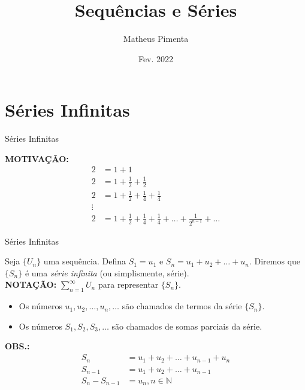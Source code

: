 \documentclass[hyperref={pdfpagelabels=false}]{beamer}
\title{Sequências e Séries}
\author[Matheus Pimenta]{Matheus Pimenta}
\institute[UEL]{\normalsize Universidade Estadual de Londrina \\
	Londrina
}
\date{Fev. 2022}
\begin{document}
	
\begin{frame}
\titlepage
\end{frame} 



\section{Séries Infinitas}

\begin{frame}{Séries Infinitas}

{\bf MOTIVAÇÃO:} \pause
\begin{align*}
 2 &= 1 + 1 \\
 2 &= 1 + \frac{1}{2} + \frac{1}{2} \\
 2 &= 1 + \frac{1}{2} + \frac{1}{4} + \frac{1}{4} \\
 \vdots \\
 2 &= 1 + \frac{1}{2} + \frac{1}{4} + \frac{1}{4} + \dots + \frac{1}{2^{n-1}} + \dots
\end{align*}

\end{frame}

\begin{frame}{Séries Infinitas}
 \begin{definition}
  Seja $\{U_n\}$ uma sequência. Defina $S_1 = u_1$ e $S_n = u_1 + u_2 + \dots + u_n$. Diremos que $\{S_n\}$ é uma \emph{série infinita} (ou simplismente, série). \\
  {\bf NOTAÇÃO:} $\displaystyle \sum_{n=1}^{\infty}U_n$ para representar  $\{S_n\}$. \pause
  \begin{itemize}
   \item Os números $u_1,u_2,\dots,u_n,\dots$ são chamados de termos da série $\{S_n\}$. \pause
   \item Os números $S_1, S_2, S_3, \dots$ são chamados de somas parciais da série.
  \end{itemize}
 \end{definition}
 \pause

 {\bf OBS.:} 
 \begin{align*}
  S_n &= u_1 + u_2 + \dots + u_{n-1} + u_n \\
  S_{n-1} &= u_1 + u_2 + \dots + u_{n-1} \\
  S_n - S_{n-1} &= u_n, n \in \mathbb{N}
 \end{align*}
\end{frame}
\end{document}
